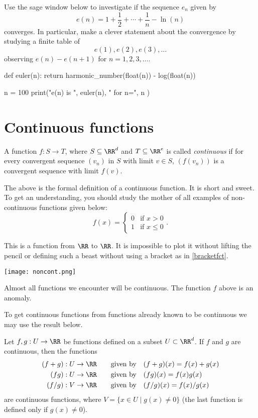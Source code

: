 \documentclass{article}
\begin{document}
Use the sage window below to investigate if the sequence $e_n$ given by
$$
e(n) = 1 + \frac{1}{2} + \cdots + \frac{1}{n} - \ln(n)
$$
converges. In particular, make a clever statement about the convergence by studying a finite table
of
$$
e(1), e(2), e(3), \dots
$$
observing $e(n) - e(n+1)$ for $n = 1, 2, 3, \dots$.

\begin{sage}
def euler(n):
  return harmonic_number(float(n)) - log(float(n))

n = 100
print("e(n) is ", euler(n), " for n=", n )
\end{sage}
\endshex

\section{Continuous functions}

\begin{definition}
A function $f: S\rightarrow T$, where $S \subseteq \RR^d$ and $T\subseteq \RR^e$ is
called \emph{continuous} if for every
convergent sequence $(v_n)$ in $S$ with limit $v\in S$, $(f(v_n))$ is a
convergent sequence with limit $f(v)$.
\end{definition}


The above is the formal definition of a continuous function. It is short and sweet. To
get an understanding, you should study the mother of all examples of 
non-continuous functions given below:
\begin{equation}\label{bracketfct}
f(x) =
\begin{cases}
  0 &\text{if } x > 0\\
  1 &\text{if } x \leq 0
\end{cases}.
\end{equation}

This is a function from $\RR$ to $\RR$. It is impossible to plot it
without lifting the pencil or defining such a beast without using a
bracket as in \eqref{bracketfct}.

\texttt{[image: noncont.png]}

Almost all functions we encounter will be continuous. The function $f$ above is an
anomaly.

To get continuous functions from functions already known to be continuous we 
may use the result below.

\begin{proposition}\label{contfunccomp}
Let $f, g: U\rightarrow \RR$ be functions defined on a subset $U\subset \RR^d$. If
$f$ and $g$ are continuous, then the functions
\begin{align*}
(f + g): U\rightarrow \RR\qquad\text{given by}\quad &(f + g)(x) = f(x) + g(x)\\
(f g): U\rightarrow \RR\qquad\text{given by}\quad &(f g)(x) = f(x) g(x)\\
(f/g): V\rightarrow \RR\qquad\text{given by}\quad &(f/g)(x) = f(x)/g(x)
\end{align*}
are continuous functions, where $V = \{x\in U\mid g(x)\neq 0\}$ (the last function is
defined only if $g(x)\neq 0$).
\end{proposition}
\end{document}

